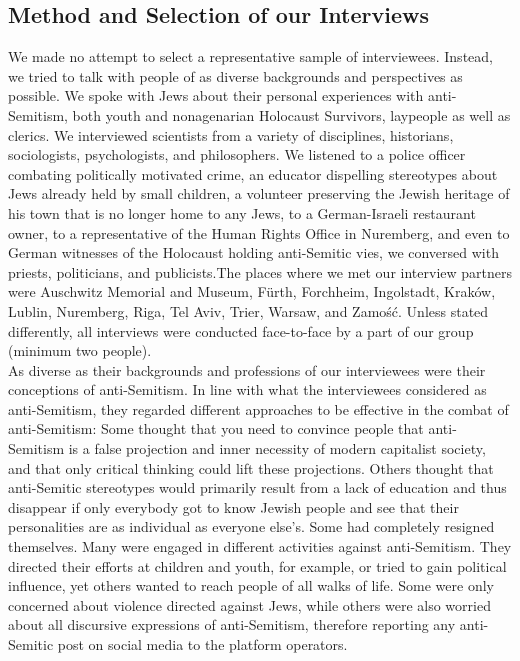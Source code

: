 \subsection*{Method and Selection of our Interviews}
We made no attempt to select a representative sample of interviewees. Instead, we tried to talk with people of as diverse backgrounds and perspectives as possible. We spoke with Jews about their personal experiences with anti-Semitism, both youth and nonagenarian Holocaust Survivors, laypeople as well as clerics. We interviewed scientists from a variety of disciplines, historians, sociologists, psychologists, and philosophers. We listened to a police officer combating politically motivated crime, an educator dispelling stereotypes about Jews already held by small children, a volunteer preserving the Jewish heritage of his town that is no longer home to any Jews, to a German-Israeli restaurant owner, to a representative of the Human Rights Office in Nuremberg, and even to German witnesses of the Holocaust holding anti-Semitic vies, we conversed with priests, politicians, and publicists.The places where we met our interview partners were Auschwitz Memorial and Museum, Fürth, Forchheim, Ingolstadt, Kraków, Lublin, Nuremberg, Riga, Tel Aviv, Trier, Warsaw, and Zamość. Unless stated differently, all interviews were conducted face-to-face by a part of our group (minimum two people). \\
As diverse as their backgrounds and professions of our interviewees were their conceptions of anti-Semitism. In line with what the interviewees considered as anti-Semitism, they regarded different approaches to be effective in the combat of anti-Semitism: Some thought that you need to convince people that anti-Semitism is a false projection and inner necessity of modern capitalist society, and that only critical thinking could lift these projections. Others thought that anti-Semitic stereotypes would primarily result from a lack of education and thus disappear if only everybody got to know Jewish people and see that their personalities are as individual as everyone else's. Some had completely resigned themselves. Many were engaged in different activities against anti-Semitism. They directed their efforts at children and youth, for example, or tried to gain political influence, yet others wanted to reach people of all walks of life. Some were only concerned about violence directed against Jews, while others were also worried about all discursive expressions of anti-Semitism, therefore reporting any anti-Semitic post on social media to the platform operators. 
